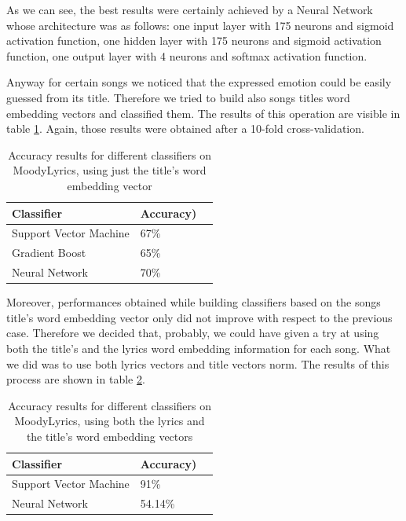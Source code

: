 As we can see, the best results were certainly achieved by a Neural Network whose architecture was as follows: one input layer with 175 neurons and sigmoid activation function, one hidden layer with 175 neurons and sigmoid activation function, one output layer with 4 neurons and softmax activation function.

Anyway for certain songs we noticed that the expressed emotion could be easily guessed from its title. Therefore
we tried to build also songs titles word embedding vectors and classified them. The results of this operation are 
visible in table \ref{table:ml-simple-results-title}. Again, those results were obtained after a 10-fold cross-validation. 

\begin{table}[H]
\centering
\begin{tabular}{@{}lll@{}}
\toprule
\textbf{Classifier} & \textbf{Accuracy})   \\ \midrule
Support Vector Machine & 67\%  \\
Gradient Boost & 65\%  \\
Neural Network & 70\%  \\
\end{tabular}
\caption{Accuracy results for different classifiers on MoodyLyrics, using just the title's word embedding vector}
\label{table:ml-simple-results-title}
\end{table}

Moreover, performances obtained while building classifiers based on the songs title's word embedding vector only
did not improve with respect to the previous case. Therefore we decided
that, probably, we could have given a try at using both the title's and the lyrics word embedding information for each
song. What we did was to use both lyrics vectors and title vectors norm. The results of this process are shown in table \ref{table:ml-simple-results-both}.

\begin{table}[H]
\centering
\begin{tabular}{@{}lll@{}}
\toprule
\textbf{Classifier} & \textbf{Accuracy})   \\ \midrule
Support Vector Machine & 91\%  \\
Neural Network & 54.14\%  \\
\end{tabular}
\caption{Accuracy results for different classifiers on MoodyLyrics, using both the lyrics and the title's word embedding vectors}
\label{table:ml-simple-results-both}
\end{table}


